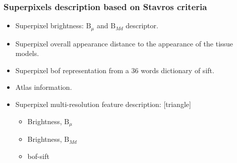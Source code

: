 \begin{frame}\frametitle{Superpixels description based on Stavros criteria}
		\begin{itemize}
		\item<1-> Superpixel brightness: $\text{B}_\mu$ and $\text{B}_{Md}$ descriptor.
		\item<1-> Superpixel overall appearance distance to the appearance of the tissue models.

		\item<2-> Superpixel \ac{bof} representation from a 36 words dictionary of \ac{sift}.

		\item<3-> Atlas information.		

		\item<4-> Superpixel multi-resolution feature description:
		\onslide<4>
		[triangle]
						\begin{itemize}
						\item Brightness, $\text{B}_\mu$
						\item Brightness, $\text{B}_{Md}$
						\item \ac{bof}-\ac{sift}					
						\end{itemize}	
		\end{itemize}
\end{frame}


